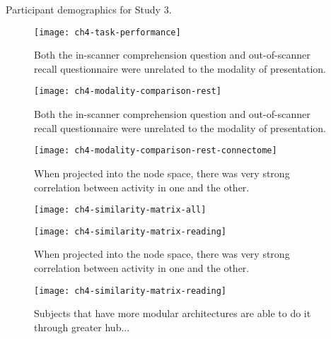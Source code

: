 \begin{table}[t]
	\renewcommand{\tabcolsep}{0.09cm}
	\centering
	
	\caption[Participant demographics for Study 3.]{Participant demographics for Study 3.}
	\label{table:ch4-participants}
\end{table}


\begin{figure}[t]
	\centering
	\texttt{[image: ch4-task-performance]}
    \caption[Behavioral metrics of passage performance were unrelated to modality.]{Both the in-scanner comprehension question and out-of-scanner recall questionnaire were unrelated to the modality of presentation.}
	\label{fig:ch4-task-performance}
\end{figure}


\begin{figure}[t]
	\centering
	\texttt{[image: ch4-modality-comparison-rest]}
    \caption[Large overlap between listening and reading activation.]{Both the in-scanner comprehension question and out-of-scanner recall questionnaire were unrelated to the modality of presentation.}
	\label{fig:ch4-modality-comparison-rest}
\end{figure}


\begin{figure}[t]
	\centering
	\texttt{[image: ch4-modality-comparison-rest-connectome]}
    \caption[Large overlap between listening and reading activation in the connectome space.]{When projected into the node space, there was very strong correlation between activity in one and the other.}
	\label{fig:ch4-modality-comparison-rest-connectome}
\end{figure}


\begin{figure}[t]
	\centering
	\texttt{[image: ch4-similarity-matrix-all]}
    \caption[Auditory network organization is more similar for all subjects than it is for reading.]{}
	\label{fig:ch4-modality-network-similarity}
\end{figure}

\begin{figure}[t]
	\centering
	\texttt{[image: ch4-similarity-matrix-reading]}
    \caption[Network similarity between listening and reading predicts word efficiency.]{When projected into the node space, there was very strong correlation between activity in one and the other.}
	\label{fig:ch4-modality-network-similarity}
\end{figure}


\begin{figure}[t]
	\centering
	\texttt{[image: ch4-similarity-matrix-reading]}
    \caption[Diversity of between-network connections predominates on .... ]{Subjects that have more modular architectures are able to do it through greater hub... }
	\label{fig:ch4-modality-network-similarity}
\end{figure}